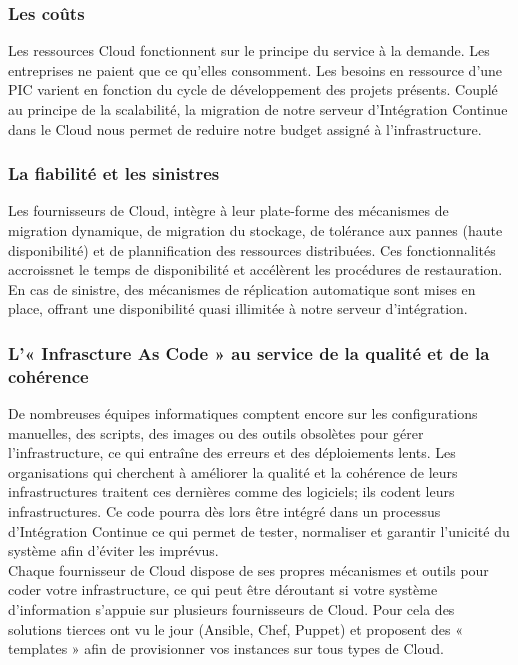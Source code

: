         \subsubsection{Les coûts}
        Les ressources Cloud fonctionnent sur le principe du service à la demande. Les entreprises ne paient que ce qu'elles consomment. Les besoins en ressource d'une PIC varient en fonction du cycle de développement des projets présents. Couplé au principe de la scalabilité, la migration de notre serveur d'Intégration Continue dans le Cloud nous permet de reduire notre budget assigné à l'infrastructure.

        \subsubsection{La fiabilité et les sinistres}
        Les fournisseurs de Cloud, intègre à leur plate-forme des mécanismes de migration dynamique, de migration du stockage, de tolérance aux pannes (haute disponibilité) et de plannification des ressources distribuées. Ces fonctionnalités accroissnet le temps de disponibilité et accélèrent les procédures de restauration. En cas de sinistre, des mécanismes de réplication automatique sont mises en place, offrant une disponibilité quasi illimitée à notre serveur d'intégration.

        \subsubsection{L'« Infrascture As Code » au service de la qualité et de la cohérence}
        De nombreuses équipes informatiques comptent encore sur les configurations manuelles, des scripts, des images ou des outils obsolètes pour gérer l'infrastructure, ce qui entraîne des erreurs et des déploiements lents. Les organisations qui cherchent à améliorer la qualité et la cohérence de leurs infrastructures traitent ces dernières comme des logiciels; ils codent leurs infrastructures. Ce code pourra dès lors être intégré dans un processus d'Intégration Continue ce qui permet de tester, normaliser et garantir l'unicité du système afin d'éviter les imprévus.\\

        Chaque fournisseur de Cloud dispose de ses propres mécanismes et outils pour coder votre infrastructure, ce qui peut être déroutant si votre système d'information s'appuie sur plusieurs fournisseurs de Cloud. Pour cela des solutions tierces ont vu le jour (Ansible, Chef, Puppet) et proposent des « templates » afin de provisionner vos instances sur tous types de Cloud.

